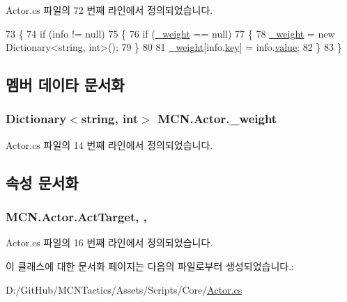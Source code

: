 Actor.\+cs 파일의 72 번째 라인에서 정의되었습니다.


\begin{DoxyCode}
73         \{
74             \textcolor{keywordflow}{if} (info != null)
75             \{
76                 \textcolor{keywordflow}{if} (\hyperlink{class_m_c_n_1_1_actor_abf0c60f05e2a904b0b225b4839a7296d}{\_weight} == null)
77                 \{
78                     \hyperlink{class_m_c_n_1_1_actor_abf0c60f05e2a904b0b225b4839a7296d}{\_weight} = \textcolor{keyword}{new} Dictionary<string, int>();
79                 \}
80 
81                 \hyperlink{class_m_c_n_1_1_actor_abf0c60f05e2a904b0b225b4839a7296d}{\_weight}[info.\hyperlink{class_m_c_n_1_1_pair_a62c546d3829b8819a65f8c9d64200338}{key}] = info.\hyperlink{class_m_c_n_1_1_pair_a1980bbf37b60fcbfea22382f71250e84}{value};
82             \}
83         \}
\end{DoxyCode}


\subsection{멤버 데이타 문서화}
\subsubsection[{\texorpdfstring{\+\_\+weight}{_weight}}]{\setlength{\rightskip}{0pt plus 5cm}Dictionary$<$string, int$>$ M\+C\+N.\+Actor.\+\_\+weight\hspace{0.3cm}{\ttfamily [private]}}\hypertarget{class_m_c_n_1_1_actor_abf0c60f05e2a904b0b225b4839a7296d}{}\label{class_m_c_n_1_1_actor_abf0c60f05e2a904b0b225b4839a7296d}


Actor.\+cs 파일의 14 번째 라인에서 정의되었습니다.



\subsection{속성 문서화}
\subsubsection[{\texorpdfstring{Act\+Target}{ActTarget}}]{ M\+C\+N.\+Actor.\+Act\+Target\hspace{0.3cm}{\ttfamily [get]}, {}, {\ttfamily [protected]}}\hypertarget{class_m_c_n_1_1_actor_a4e2e573370bb52bb747f77d4c75dc7e1}{}\label{class_m_c_n_1_1_actor_a4e2e573370bb52bb747f77d4c75dc7e1}


Actor.\+cs 파일의 16 번째 라인에서 정의되었습니다.



이 클래스에 대한 문서화 페이지는 다음의 파일로부터 생성되었습니다.\+:\begin{DoxyCompactItemize}
\item 
D\+:/\+Git\+Hub/\+M\+C\+N\+Tactics/\+Assets/\+Scripts/\+Core/\hyperlink{_actor_8cs}{Actor.\+cs}\end{DoxyCompactItemize}
